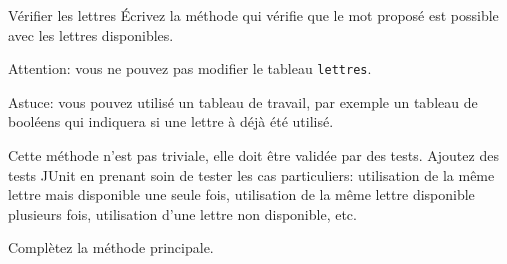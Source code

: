 \documentclass[a4paper,11pt]{style-esi/td}
\begin{document}
 	\begin{Exercice}{Vérifier les lettres}
 			\'Ecrivez la méthode 
		qui vérifie que le mot proposé est possible avec les lettres 
		disponibles. 
		
		Attention: vous ne pouvez pas modifier le tableau \texttt{lettres}.
		
		Astuce: vous pouvez utilisé un tableau de travail, par exemple un 
		tableau de booléens qui indiquera si une lettre à déjà été utilisé.
		
		Cette méthode n'est pas triviale, elle doit être validée par des tests.
		Ajoutez des tests JUnit en prenant soin de tester les cas particuliers: 
		utilisation de la même lettre mais disponible une seule fois, utilisation de la 
		même lettre disponible plusieurs fois, utilisation d'une lettre non 
		disponible, etc.
		
		Complètez la méthode principale.
	\end{Exercice} 
	
\end{document}

